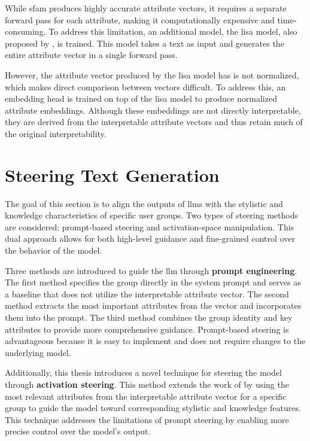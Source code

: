 While \ac{sfam} produces highly accurate attribute vectors, it requires a separate forward pass for each attribute, making it computationally expensive and time-consuming. To address this limitation, an additional model, the \acf{lisa} model, also proposed by \citet{patelLearningInterpretableStyle2023}, is trained. This model takes a text as input and generates the entire attribute vector in a single forward pass.

However, the attribute vector produced by the \ac{lisa} model has is not normalized, which makes direct comparison between vectors difficult. To address this, an embedding head is trained on top of the \ac{lisa} model to produce normalized attribute embeddings. Although these embeddings are not directly interpretable, they are derived from the interpretable attribute vectors and thus retain much of the original interpretability.

\section{Steering Text Generation}%
\label{sec:approach:steering}

The goal of this section is to align the outputs of \acp{llm} with the stylistic and knowledge characteristics of specific user groups. Two types of steering methods are considered: prompt-based steering and activation-space manipulation. This dual approach allows for both high-level guidance and fine-grained control over the behavior of the model.

Three methods are introduced to guide the \ac{llm} through \textbf{prompt engineering}. The first method specifies the group directly in the system prompt and serves as a baseline that does not utilize the interpretable attribute vector. The second method extracts the most important attributes from the vector and incorporates them into the prompt. The third method combines the group identity and key attributes to provide more comprehensive guidance. Prompt-based steering is advantageous because it is easy to implement and does not require changes to the underlying model.

Additionally, this thesis introduces a novel technique for steering the model through \textbf{activation steering}. This method extends the work of \citet{konenStyleVectorsSteering2024,turnerActivationAdditionSteering2024,rimsky-etal-2024-steering} by using the most relevant attributes from the interpretable attribute vector for a specific group to guide the model toward corresponding stylistic and knowledge features. This technique addresses the limitations of prompt steering by enabling more precise control over the model's output.

